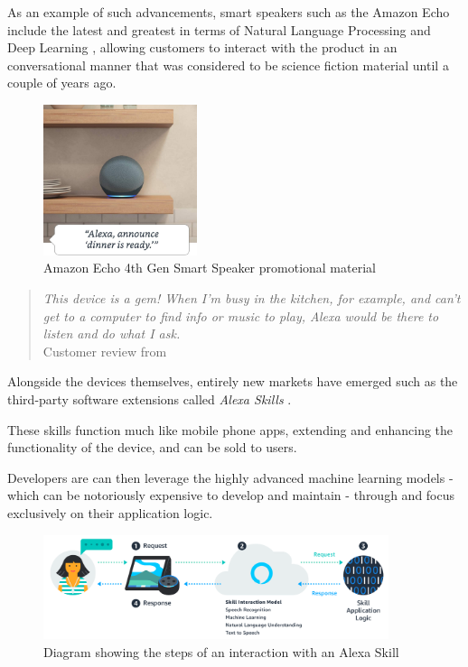 \documentclass[openright]{normas-utf-tex} %
\begin{document}
As an example of such advancements, smart speakers such as the Amazon Echo \cite{GaoPanWangChen2018} include the latest and greatest
in terms of Natural Language Processing and Deep Learning \cite{Young2018}, allowing customers to interact with the product in an conversational manner
that was considered to be science fiction material until a couple of years ago.

\begin{figure}[!htb]
	\centering
	\includegraphics[width=0.4\textwidth]{./images/echodot4.jpg} %
	\caption[Amazon Echo 4th Generation smart speaker promotional material]{Amazon Echo 4th Gen Smart Speaker promotional material}
	\label{fig:dummy}
\end{figure}

\begin{quote}
    \textit{This device is a gem! When I’m busy in the kitchen, for example, and can’t get
    to a computer to find info or music to play, Alexa would be there to listen
    and do what I ask.} \\
    Customer review from \cite{GaoPanWangChen2018}
\end{quote}

Alongside the devices themselves, entirely new markets have emerged such as the third-party software extensions
called \textit{Alexa Skills} \cite{Alexa2022}.

These skills function much like mobile phone apps, extending and enhancing the functionality of the device, and
can be sold to users.

Developers are can then leverage the highly advanced machine learning models - which can be notoriously expensive to develop 
and maintain \cite{Phdata2021} - through  and focus exclusively on their application logic.

\begin{figure}[htb!]
	\centering
	\includegraphics[width=0.9\textwidth]{./images/skills.png} %
	\caption[]{Diagram showing the steps of an interaction with an Alexa Skill}
	\label{fig:dummy}
\end{figure}
\end{document}
